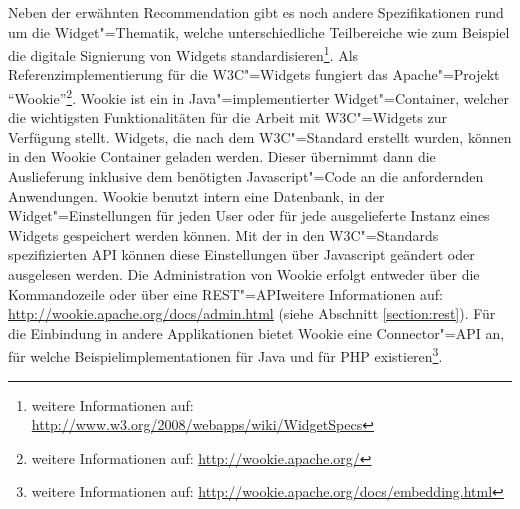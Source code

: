Neben der erwähnten Recommendation gibt es noch andere Spezifikationen rund um die Widget"=Thematik, welche unterschiedliche Teilbereiche wie zum Beispiel die digitale Signierung von Widgets standardisieren\footnote{weitere Informationen auf: \url{http://www.w3.org/2008/webapps/wiki/WidgetSpecs}}. Als Referenzimplementierung für die W3C"=Widgets fungiert das Apache"=Projekt "`Wookie"'\footnote{weitere Informationen auf: \url{http://wookie.apache.org/}}. Wookie ist ein in Java"=implementierter Widget"=Container, welcher die wichtigsten Funktionalitäten für die Arbeit mit \ac{W3C}"=Widgets zur Verfügung stellt. Widgets, die nach dem \ac{W3C}"=Standard erstellt wurden, können in den Wookie Container geladen werden. Dieser übernimmt dann die Auslieferung inklusive dem benötigten Javascript"=Code an die anfordernden Anwendungen. Wookie benutzt intern eine Datenbank, in der Widget"=Einstellungen für jeden User oder für jede ausgelieferte Instanz eines Widgets gespeichert werden können. Mit der in den \ac{W3C}"=Standards spezifizierten \ac{API} können diese Einstellungen über Javascript geändert oder ausgelesen werden. Die Administration von Wookie erfolgt entweder über die Kommandozeile oder über eine REST"=\ac{API}{weitere Informationen auf: \url{http://wookie.apache.org/docs/admin.html}} (siehe Abschnitt \ref{section:rest}). Für die Einbindung in andere Applikationen bietet Wookie eine Connector"=\ac{API} an, für welche Beispielimplementationen für Java und für PHP existieren\footnote{weitere Informationen auf: \url{http://wookie.apache.org/docs/embedding.html}}.

